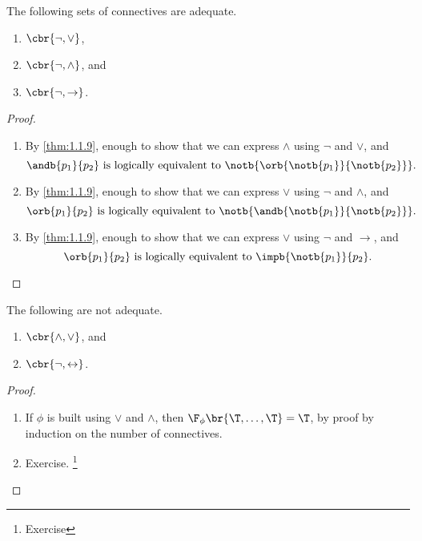 \begin{corollary}
The following sets of connectives are adequate.
\begin{enumerate}
\item $ \cbr{\neg, \lor} $,
\item $ \cbr{\neg, \land} $, and
\item $ \cbr{\neg, \rightarrow} $.
\end{enumerate}
\end{corollary}

\begin{proof}
\hfill
\begin{enumerate}
\item By \ref{thm:1.1.9}, enough to show that we can express $ \land $ using $ \neg $ and $ \lor $, and
$$ \andb{p_1}{p_2} \ \text{is logically equivalent to} \ \notb{\orb{\notb{p_1}}{\notb{p_2}}}. $$
\item By \ref{thm:1.1.9}, enough to show that we can express $ \lor $ using $ \neg $ and $ \land $, and
$$ \orb{p_1}{p_2} \ \text{is logically equivalent to} \ \notb{\andb{\notb{p_1}}{\notb{p_2}}}. $$
\item By \ref{thm:1.1.9}, enough to show that we can express $ \lor $ using $ \neg $ and $ \rightarrow $, and
$$ \orb{p_1}{p_2} \ \text{is logically equivalent to} \ \impb{\notb{p_1}}{p_2}. $$
\end{enumerate}
\end{proof}

\pagebreak


\begin{example}
The following are not adequate.
\begin{enumerate}
\item $ \cbr{\land, \lor} $, and
\item $ \cbr{\neg, \leftrightarrow} $.
\end{enumerate}
\end{example}

\begin{proof}
\hfill
\begin{enumerate}
\item If $ \phi $ is built using $ \lor $ and $ \land $, then $ \F_\phi\br{\T, \dots, \T} = \T $, by proof by induction on the number of connectives.
\item Exercise. \footnote{Exercise}
\end{enumerate}
\end{proof}

